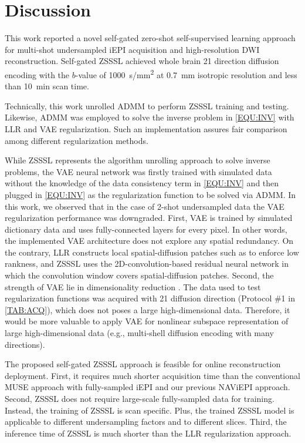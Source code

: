 \documentclass[journal,twoside,web]{ieeecolor}
\begin{document}
	\section{Discussion}

	This work reported a novel self-gated zero-shot self-supervised learning approach
	for multi-shot undersampled iEPI acquisition and high-resolution DWI reconstruction.
	Self-gated ZSSSL achieved whole brain 21 direction diffusion encoding
	with the $b$-value of \SI{1000}{s/mm^2}
	at \SI{0.7}{mm} isotropic resolution
	and less than \SI{10}{\minute} scan time.

	Technically, this work unrolled ADMM to perform ZSSSL training and testing.
	Likewise, ADMM was employed to solve the inverse problem in \cref{EQU:INV}
	with LLR and VAE regularization.
	Such an implementation assures fair comparison among different regularization methods.

	While ZSSSL represents the algorithm unrolling approach to solve inverse problems,
	the VAE neural network was firstly trained with simulated data
	without the knowledge of the data consistency term in \cref{EQU:INV} and
	then plugged in \cref{EQU:INV} as the regularization function to be solved via ADMM.
	In this work, we observed that in the case of 2-shot undersampled data
	the VAE regularization performance was downgraded.
	First, VAE is trained by simulated dictionary data and
	uses fully-connected layers for every pixel.
	In other words, the implemented VAE architecture does not explore any spatial redundancy.
	On the contrary, LLR constructs local spatial-diffusion patches such as to enforce low rankness, and ZSSSL uses the 2D-convolution-based residual neural network
	in which the convolution window covers spatial-diffusion patches.
	Second, the strength of VAE lie in dimensionality reduction \cite{hinton_2006_ae}.
	The data used to test regularization functions
	was acquired with 21 diffusion direction (Protocol \#1 in \cref{TAB:ACQ}),
	which does not poses a large high-dimensional data.
	Therefore, it would be more valuable to apply VAE
	for nonlinear subspace representation of large high-dimensional data
	(e.g., multi-shell diffusion encoding with many directions).

	The proposed self-gated ZSSSL approach is feasible for online reconstruction deployment.
	First, it requires much shorter acquisition time than
	the conventional MUSE approach with fully-sampled iEPI and
	our previous NAViEPI approach.
	Second, ZSSSL does not require large-scale fully-sampled data for training.
	Instead, the training of ZSSSL is scan specific.
	Plus, the trained ZSSSL model is applicable to different undersampling factors
	and to different slices.
	Third, the inference time of ZSSSL is much shorter than the LLR regularization approach.
\end{document}
